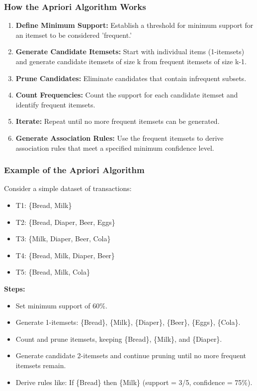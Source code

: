 \documentclass{beamer}
\begin{document}
\begin{frame}[fragile]
    \frametitle{How the Apriori Algorithm Works}
    \begin{enumerate}
        \item \textbf{Define Minimum Support:} Establish a threshold for minimum support for an itemset to be considered 'frequent.'
        \item \textbf{Generate Candidate Itemsets:} Start with individual items (1-itemsets) and generate candidate itemsets of size k from frequent itemsets of size k-1.
        \item \textbf{Prune Candidates:} Eliminate candidates that contain infrequent subsets.
        \item \textbf{Count Frequencies:} Count the support for each candidate itemset and identify frequent itemsets.
        \item \textbf{Iterate:} Repeat until no more frequent itemsets can be generated.
        \item \textbf{Generate Association Rules:} Use the frequent itemsets to derive association rules that meet a specified minimum confidence level.
    \end{enumerate}
\end{frame}

\begin{frame}[fragile]
    \frametitle{Example of the Apriori Algorithm}
    Consider a simple dataset of transactions:
    \begin{itemize}
        \item T1: \{Bread, Milk\}
        \item T2: \{Bread, Diaper, Beer, Eggs\}
        \item T3: \{Milk, Diaper, Beer, Cola\}
        \item T4: \{Bread, Milk, Diaper, Beer\}
        \item T5: \{Bread, Milk, Cola\}
    \end{itemize}

    \textbf{Steps:}
    \begin{itemize}
        \item Set minimum support of 60\%.
        \item Generate 1-itemsets: \{Bread\}, \{Milk\}, \{Diaper\}, \{Beer\}, \{Eggs\}, \{Cola\}.
        \item Count and prune itemsets, keeping \{Bread\}, \{Milk\}, and \{Diaper\}.
        \item Generate candidate 2-itemsets and continue pruning until no more frequent itemsets remain.
        \item Derive rules like: If \{Bread\} then \{Milk\} (support = 3/5, confidence = 75\%).
    \end{itemize}
\end{frame}
\end{document}
